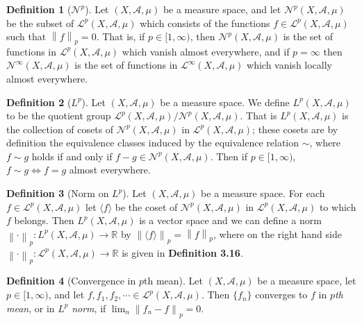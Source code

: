 \documentclass[12pt]{article}
\theoremstyle{definition}
\newtheorem{definition}{Definition}[section]
\newcommand{\real}{\mathbb{R}}   %
\newcommand{\algebra}{\mathscr{A}}
\renewcommand{\L}{\mathscr{L}}
\newcommand\norm[1]{\left\lVert#1\right\rVert}
\begin{document}
\begin{definition}[$\mathscr{N}^p$]
    Let $(X,\algebra,\mu)$ be a measure space, and let $\mathscr{N}^p(X,\algebra,\mu)$ be the subset of $\L^p(X,\algebra,\mu)$ which consists of the functions $f\in \L^p(X,\algebra,\mu)$ such that $\norm{f}_p=0$. That is, if $p\in[1,\infty)$, then $\mathscr{N}^p(X,\algebra,\mu)$ is the set of functions in $\L^p(X,\algebra,\mu)$ which vanish almost everywhere, and if $p=\infty$ then $\mathscr{N}^\infty(X,\algebra,\mu)$ is the set of functions in $\L^\infty(X,\algebra,\mu)$ which vanish locally almost everywhere.
\end{definition}
\newpage
\begin{definition}[$L^p$]
    Let $(X,\algebra,\mu)$ be a measure space. We define $L^p(X,\algebra,\mu)$ to be the quotient group $\L^p(X,\algebra,\mu)/\mathscr{N}^p(X,\algebra,\mu)$. That is $L^p(X,\algebra,\mu)$ is the collection of cosets of $\mathscr{N}^p(X,\algebra,\mu)$ in $\L^p(X,\algebra,\mu)$; these cosets are by definition the equivalence classes induced by the equivalence relation $\sim$, where $f\sim g$ holds if and only if $f-g\in\mathscr{N}^p(X,\algebra,\mu)$. Then if $p\in[1,\infty)$, $f\sim g\Longleftrightarrow f=g$ almost everywhere.
\end{definition}
\begin{definition}[Norm on $L^p$]
     Let $(X,\algebra,\mu)$ be a measure space. For each $f\in\L^p(X,\algebra,\mu)$ let $\langle f\rangle$ be the coset of $\mathscr{N}^p(X,\algebra,\mu)$ in $\L^p(X,\algebra,\mu)$ to which $f$ belongs. Then $L^p(X,\algebra,\mu)$ is a vector space and we can define a norm $\norm{\cdot}_p:L^p(X,\algebra,\mu)\to \real$ by $\norm{\langle f\rangle}_p=\norm{f}_p$, where on the right hand side $\norm{\cdot}_p:\L^p(X,\algebra,\mu)\to \real$ is given in \textbf{Definition 3.16}.
\end{definition}
\begin{definition}[Convergence in $p$th mean]
    Let $(X,\algebra,\mu)$ be a measure space, let $p\in [1,\infty)$, and let $f,f_1,f_2,\cdots \in \L^p(X,\algebra,\mu)$. Then $\{f_n\}$ converges to $f$ in $p$\textit{th mean}, or in $L^p$ \textit{norm}, if $\lim_n \norm{f_n-f}_p=0$.
\end{definition}
\end{document}
